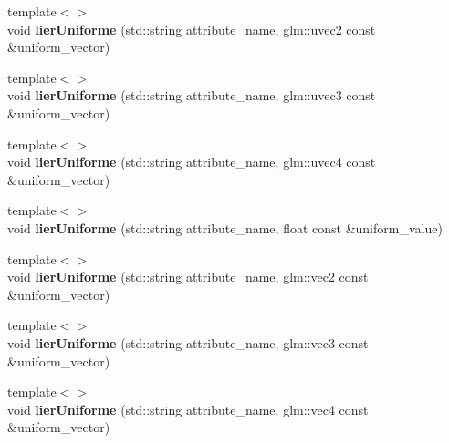 \begin{DoxyCompactItemize}
\item 
\hypertarget{classopengl_1_1_programme_aa7a84a3b09bd15da89a028737dc06b89}{{\footnotesize template$<$$>$ }\\void {\bfseries lier\-Uniforme} (std\-::string attribute\-\_\-name, glm\-::uvec2 const \&uniform\-\_\-vector)}\label{classopengl_1_1_programme_aa7a84a3b09bd15da89a028737dc06b89}

\item 
\hypertarget{classopengl_1_1_programme_ac65f446e54327ae4cfb002e1d384603d}{{\footnotesize template$<$$>$ }\\void {\bfseries lier\-Uniforme} (std\-::string attribute\-\_\-name, glm\-::uvec3 const \&uniform\-\_\-vector)}\label{classopengl_1_1_programme_ac65f446e54327ae4cfb002e1d384603d}

\item 
\hypertarget{classopengl_1_1_programme_aff769b8420ff80673fffdf3750b03953}{{\footnotesize template$<$$>$ }\\void {\bfseries lier\-Uniforme} (std\-::string attribute\-\_\-name, glm\-::uvec4 const \&uniform\-\_\-vector)}\label{classopengl_1_1_programme_aff769b8420ff80673fffdf3750b03953}

\item 
\hypertarget{classopengl_1_1_programme_a00f2b97cc3b5835a742065d07352c189}{{\footnotesize template$<$$>$ }\\void {\bfseries lier\-Uniforme} (std\-::string attribute\-\_\-name, float const \&uniform\-\_\-value)}\label{classopengl_1_1_programme_a00f2b97cc3b5835a742065d07352c189}

\item 
\hypertarget{classopengl_1_1_programme_ad5359af3f747d2c02de2b1b8cec15a55}{{\footnotesize template$<$$>$ }\\void {\bfseries lier\-Uniforme} (std\-::string attribute\-\_\-name, glm\-::vec2 const \&uniform\-\_\-vector)}\label{classopengl_1_1_programme_ad5359af3f747d2c02de2b1b8cec15a55}

\item 
\hypertarget{classopengl_1_1_programme_aabecc92109a8bbef2c29874b776b5d48}{{\footnotesize template$<$$>$ }\\void {\bfseries lier\-Uniforme} (std\-::string attribute\-\_\-name, glm\-::vec3 const \&uniform\-\_\-vector)}\label{classopengl_1_1_programme_aabecc92109a8bbef2c29874b776b5d48}

\item 
\hypertarget{classopengl_1_1_programme_aaffd5501051901f59115e0a5825d2705}{{\footnotesize template$<$$>$ }\\void {\bfseries lier\-Uniforme} (std\-::string attribute\-\_\-name, glm\-::vec4 const \&uniform\-\_\-vector)}\label{classopengl_1_1_programme_aaffd5501051901f59115e0a5825d2705}


\end{DoxyCompactItemize}
